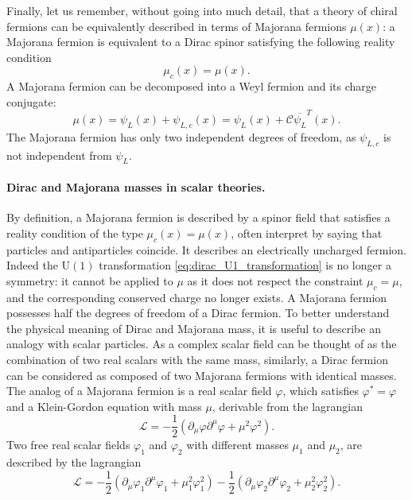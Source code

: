 Finally, let us remember, without going into much detail, that a theory of chiral fermions can be equivalently described in terms of Majorana fermions \(\mu(x)\): a Majorana fermion is equivalent to a Dirac spinor satisfying the following reality condition
\[
    \mu_c (x) = \mu(x).
\]
A Majorana fermion can be decomposed into a Weyl fermion and its charge conjugate:
\[
    \mu(x) = \psi_L (x) + \psi_{L,c} (x) = \psi_L (x) + \mathcal{C} \overline{\psi_L}^T (x).
\]
The Majorana fermion has only two independent degrees of freedom, as \(\psi_{L,c}\) is not independent from \(\psi_L\).

\paragraph{Dirac and Majorana masses in scalar theories.}
By definition, a Majorana fermion is described by a spinor field that satisfies a reality condition of the type \(\mu_c (x)=\mu(x)\), often interpret by saying that particles and antiparticles coincide. It describes an electrically uncharged fermion. Indeed the \(\mathrm{U}(1)\)  transformation \eqref{eq:dirac_U1_transformation} is no longer a symmetry: it cannot be applied to \(\mu\) as it does not respect the constraint \(\mu_c = \mu\), and the corresponding conserved charge no longer exists. A Majorana fermion possesses half the degrees of freedom of a Dirac fermion.
To better understand the physical meaning of Dirac and Majorana mass, it is useful to describe an analogy with scalar particles. As a complex scalar field can be thought of as the combination of two real scalars with the same mass, similarly, a Dirac fermion can be considered as composed of two Majorana fermions with identical masses.
The analog of a Majorana fermion is a real scalar field \(\varphi\), which satisfies \(\varphi^* = \varphi\) and a Klein-Gordon equation with mass \(\mu\), derivable from the lagrangian
\begin{equation}
    \mathcal{L} = -\frac{1}{2} \left(\partial_\mu \varphi \partial^\mu \varphi + \mu^2 \varphi^2 \right).
    \label{eq:dirac_real_scalar_field_lagrangian}
\end{equation}
Two free real scalar fields \(\varphi_1\) and \(\varphi_2\) with different masses \(\mu_1\) and \(\mu_2\), are described by the lagrangian
\begin{equation}
    \mathcal{L} = -\frac{1}{2} \left(\partial_\mu \varphi_1 \partial^\mu \varphi_1 + \mu_1^2 \varphi_1^2 \right) - \frac{1}{2} \left(\partial_\mu \varphi_2 \partial^\mu \varphi_2 + \mu_2^2 \varphi_2^2 \right).
    \label{eq:dirac_two_real_scalar_fields_lagrangian}
\end{equation}
